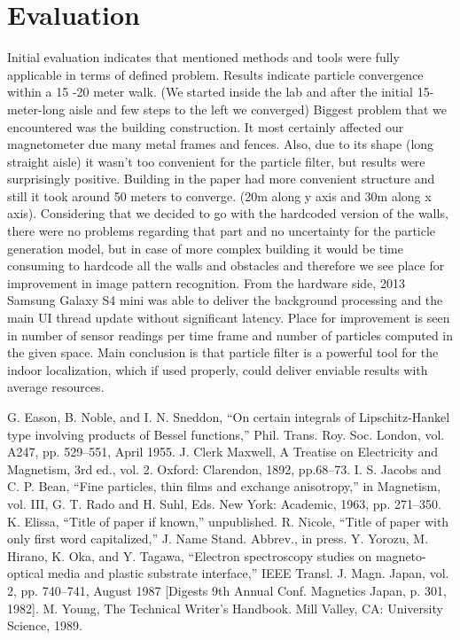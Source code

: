 \documentclass[conference]{IEEEtran}
\begin{document}
\section{Evaluation}
Initial evaluation indicates that mentioned methods and tools were fully applicable in terms of defined problem. Results indicate particle convergence within a 15 -20 meter walk. (We started inside the lab and after the initial 15-meter-long aisle and few steps to the left we converged) Biggest problem that we encountered was the building construction. It most certainly affected our magnetometer due many metal frames and fences. Also, due to its shape (long straight aisle) it wasn’t too convenient for the particle filter, but results were surprisingly positive. Building in the paper had more convenient structure and still it took around 50 meters to converge. (20m along y axis and 30m along x axis). Considering that we decided to go with the hardcoded version of the walls, there were no problems regarding that part and no uncertainty for the particle generation model, but in case of more complex building it would be time consuming to hardcode all the walls and obstacles and therefore we see place for improvement in image pattern recognition. From the hardware side, 2013 Samsung Galaxy S4 mini was able to deliver the background processing and the main UI thread update without significant latency. Place for improvement is seen in number of sensor readings per time frame and number of particles computed in the given space.  Main conclusion is that particle filter is a powerful tool for the indoor localization, which if used properly, could deliver enviable results with average resources.



\begin{thebibliography}{00}
 G. Eason, B. Noble, and I. N. Sneddon, ``On certain integrals of Lipschitz-Hankel type involving products of Bessel functions,'' Phil. Trans. Roy. Soc. London, vol. A247, pp. 529--551, April 1955.
 J. Clerk Maxwell, A Treatise on Electricity and Magnetism, 3rd ed., vol. 2. Oxford: Clarendon, 1892, pp.68--73.
 I. S. Jacobs and C. P. Bean, ``Fine particles, thin films and exchange anisotropy,'' in Magnetism, vol. III, G. T. Rado and H. Suhl, Eds. New York: Academic, 1963, pp. 271--350.
 K. Elissa, ``Title of paper if known,'' unpublished.
 R. Nicole, ``Title of paper with only first word capitalized,'' J. Name Stand. Abbrev., in press.
 Y. Yorozu, M. Hirano, K. Oka, and Y. Tagawa, ``Electron spectroscopy studies on magneto-optical media and plastic substrate interface,'' IEEE Transl. J. Magn. Japan, vol. 2, pp. 740--741, August 1987 [Digests 9th Annual Conf. Magnetics Japan, p. 301, 1982].
 M. Young, The Technical Writer's Handbook. Mill Valley, CA: University Science, 1989.
\end{thebibliography}
\end{document}
